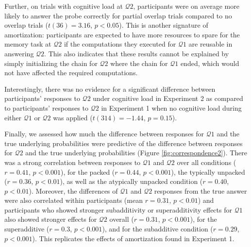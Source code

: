 Further, on trials with cognitive load at $\mathcal{Q}2$, participants were on average more likely to answer the probe correctly for partial overlap trials compared to no overlap trials ($t(36)=3.16$, $p<0.05$). This is another signature of amortization: participants are expected to have more resources to spare for the memory task at $\mathcal{Q}2$ if the computations they executed for $\mathcal{Q}1$ are reusable in answering $\mathcal{Q}2$. This also indicates that these results cannot be explained by simply initializing the chain for $\mathcal{Q}2$ where the chain for $\mathcal{Q}1$ ended, which would not have affected the required computations. 

Interestingly, there was no evidence for a significant difference between participants' responses to $\mathcal{Q}2$ under cognitive load in Experiment 2 as compared to participants' responses to $\mathcal{Q}2$ in Experiment 1 when no cognitive load during either $\mathcal{Q}1$ or $\mathcal{Q}2$ was applied ($t(314)=-1.44$, $p= 0.15$).

Finally, we assessed how much the difference between responses for $\mathcal{Q}1$ and the true underlying probabilities were predictive of the difference between responses for $\mathcal{Q}2$ and the true underlying probabilities (Figure \ref{fig:correspondence2}). There was a strong correlation between responses to $\mathcal{Q}1$ and $\mathcal{Q}2$ over all conditions ($r=0.41$, $p<0.001$), for the packed ($r=0.44$, $p<0.001$), the typically unpacked ($r=0.36$, $p<0.01$), as well as the atypically unpacked condition ($r=0.40$, $p<0.01$). Moreover, the differences of $\mathcal{Q}1$ and $\mathcal{Q}2$ responses from the true answer were also correlated within participants (mean $r=0.31$, $p<0.01$) and participants who showed stronger subadditivity or superadditivity effects for $\mathcal{Q}1$ also showed stronger effects for $\mathcal{Q}2$ overall ($r=0.31$, $p<0.001$), for the superadditive ($r=0.3$, $p<0.001$), and for the subadditive condition ($r=0.29$, $p<0.001$). This replicates the effects of amortization found in Experiment 1.

